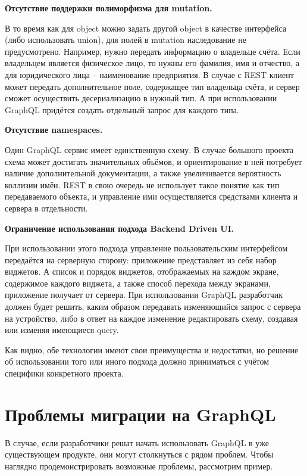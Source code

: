 \textbf{Отсутствие поддержки полиморфизма для mutation.}

В то время как для object можно задать другой object в качестве интерфейса (либо использовать union), для полей в mutation наследование не предусмотрено.
Например, нужно передать информацию о владельце счёта.
Если владельцем является физическое лицо, то нужны его фамилия, имя и отчество, а для юридического лица – наименование предприятия.
В случае с REST клиент может передать дополнительное поле, содержащее тип владельца счёта, и сервер сможет осуществить десериализацию в нужный тип.
А при использовании GraphQL придётся создать отдельный запрос для каждого типа.

\textbf{Отсутствие namespaces.}

Один GraphQL сервис имеет единственную схему.
В случае большого проекта схема может достигать значительных объёмов, и ориентирование в ней потребует наличие дополнительной документации, а также увеличивается вероятность коллизии имён.
REST в свою очередь не использует такое понятие как тип передаваемого объекта, и управление ими осуществляется средствами клиента и сервера в отдельности.

\textbf{Ограничение использования подхода Backend Driven UI.}

При использовании этого подхода управление пользовательским интерфейсом передаётся на серверную сторону: приложение представляет из себя набор виджетов.
А список и порядок виджетов, отображаемых на каждом экране, содержимое каждого виджета, а также способ перехода между экранами, приложение получает от сервера.
При использовании GraphQL разработчик должен будет решить, каким образом передавать изменяющийся запрос с сервера на устройство, либо в ответ на каждое изменение редактировать схему, создавая или изменяя имеющиеся query.

Как видно, обе технологии имеют свои преимущества и недостатки, но решение об использовании того или иного подхода должно приниматься с учётом специфики конкретного проекта.


\section{Проблемы миграции на GraphQL}\label{sec:migration-to-graphql}

В случае, если разработчики решат начать использовать GraphQL в уже существующем продукте, они могут столкнуться с рядом проблем.
Чтобы наглядно продемонстрировать возможные проблемы, рассмотрим пример.

